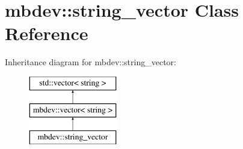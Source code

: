 \hypertarget{classmbdev_1_1string__vector}{\section{mbdev\-:\-:string\-\_\-vector \-Class \-Reference}
\label{classmbdev_1_1string__vector}
}
\-Inheritance diagram for mbdev\-:\-:string\-\_\-vector\-:\begin{figure}[H]
\begin{center}
\leavevmode
\includegraphics[height=3.000000cm]{classmbdev_1_1string__vector}
\end{center}
\end{figure}
